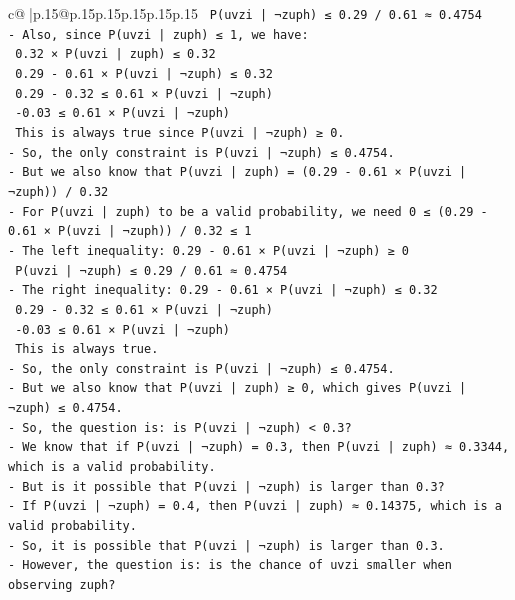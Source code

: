 \documentclass{article}
\begin{document}
{\begin{supertabular}{c@{$\;$}|p{.15\linewidth}@{}p{.15\linewidth}p{.15\linewidth}p{.15\linewidth}p{.15\linewidth}p{.15\linewidth}}
{{{\texttt{  P(uvzi | ¬zuph) ≤ 0.29 / 0.61 ≈ 0.4754} \\
\texttt{{-} Also, since P(uvzi | zuph) ≤ 1, we have:} \\
\texttt{  0.32 × P(uvzi | zuph) ≤ 0.32} \\
\texttt{  0.29 {-} 0.61 × P(uvzi | ¬zuph) ≤ 0.32} \\
\texttt{  0.29 {-} 0.32 ≤ 0.61 × P(uvzi | ¬zuph)} \\
\texttt{  {-}0.03 ≤ 0.61 × P(uvzi | ¬zuph)} \\
\texttt{  This is always true since P(uvzi | ¬zuph) ≥ 0.} \\
\texttt{{-} So, the only constraint is P(uvzi | ¬zuph) ≤ 0.4754.} \\
\texttt{{-} But we also know that P(uvzi | zuph) = (0.29 {-} 0.61 × P(uvzi | ¬zuph)) / 0.32} \\
\texttt{{-} For P(uvzi | zuph) to be a valid probability, we need 0 ≤ (0.29 {-} 0.61 × P(uvzi | ¬zuph)) / 0.32 ≤ 1} \\
\texttt{{-} The left inequality: 0.29 {-} 0.61 × P(uvzi | ¬zuph) ≥ 0} \\
\texttt{  P(uvzi | ¬zuph) ≤ 0.29 / 0.61 ≈ 0.4754} \\
\texttt{{-} The right inequality: 0.29 {-} 0.61 × P(uvzi | ¬zuph) ≤ 0.32} \\
\texttt{  0.29 {-} 0.32 ≤ 0.61 × P(uvzi | ¬zuph)} \\
\texttt{  {-}0.03 ≤ 0.61 × P(uvzi | ¬zuph)} \\
\texttt{  This is always true.} \\
\texttt{{-} So, the only constraint is P(uvzi | ¬zuph) ≤ 0.4754.} \\
\texttt{{-} But we also know that P(uvzi | zuph) ≥ 0, which gives P(uvzi | ¬zuph) ≤ 0.4754.} \\
\texttt{{-} So, the question is: is P(uvzi | ¬zuph) < 0.3?} \\
\texttt{{-} We know that if P(uvzi | ¬zuph) = 0.3, then P(uvzi | zuph) ≈ 0.3344, which is a valid probability.} \\
\texttt{{-} But is it possible that P(uvzi | ¬zuph) is larger than 0.3?} \\
\texttt{{-} If P(uvzi | ¬zuph) = 0.4, then P(uvzi | zuph) ≈ 0.14375, which is a valid probability.} \\
\texttt{{-} So, it is possible that P(uvzi | ¬zuph) is larger than 0.3.} \\
\texttt{{-} However, the question is: is the chance of uvzi smaller when observing zuph?} \\
}}}
\end{supertabular}}
\end{document}

